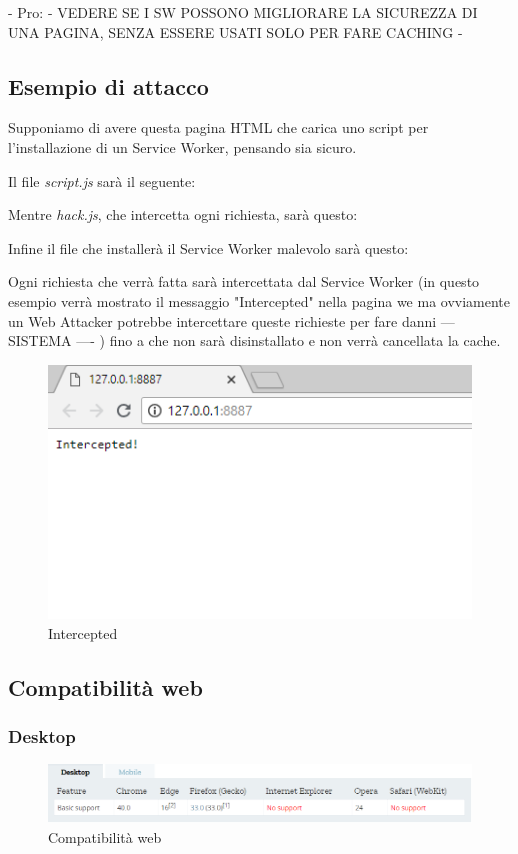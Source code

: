 \documentclass[11pt ,a4paper , twoside , openright ]{article}
\begin{document}
- Pro: - VEDERE SE I SW POSSONO MIGLIORARE LA SICUREZZA DI UNA PAGINA, SENZA ESSERE USATI SOLO PER FARE CACHING -
\newpage
\subsection{Esempio di attacco}
Supponiamo di avere questa pagina HTML che carica uno script per l'installazione di un Service Worker, pensando sia sicuro.

Il file \textit{script.js} sarà il seguente:

\pagebreak
Mentre \textit{hack.js}, che intercetta ogni richiesta, sarà questo:

Infine il file che installerà il Service Worker malevolo sarà questo:

Ogni richiesta che verrà fatta sarà intercettata dal Service Worker (in questo esempio verrà mostrato il messaggio "Intercepted" nella pagina we ma ovviamente un Web Attacker potrebbe intercettare queste richieste per fare danni --- SISTEMA ---- ) fino a che non sarà disinstallato e non verrà cancellata la cache.
\begin{figure}[h]
	\centering
	\includegraphics[width=0.7\linewidth]{Intercepted}
	\caption{Intercepted}
	\label{fig: Intercepted}
\end{figure}

\newpage
\subsection{Compatibilità web}
\subsubsection{Desktop}
\begin{figure}[h]
	\centering
	\includegraphics[width=1\linewidth]{CompWeb}
	\caption{Compatibilità web}
	\label{fig:Compatibilità web}
\end{figure}
\end{document}

